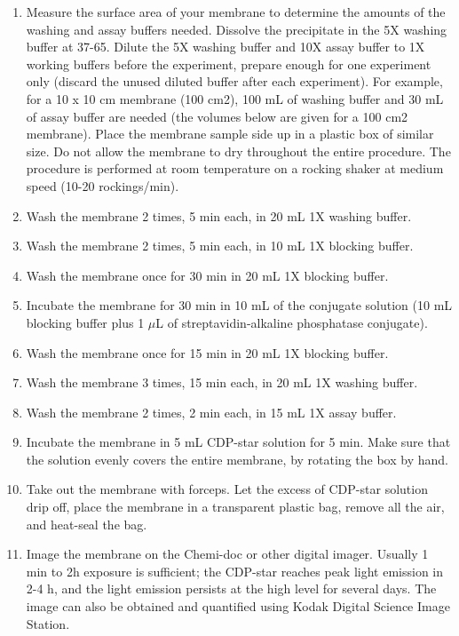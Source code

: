\documentclass{article}
\newcommand{\mul}{\ensuremath{\mu}L\xspace}
\newcommand{\degC}{\celsius\xspace}
\begin{document}
\begin{enumerate}[resume]
  \item Measure the surface area of your membrane to determine the amounts of the washing and assay buffers needed. Dissolve the precipitate in the 5X washing buffer at 37-65\degC. Dilute the 5X washing buffer and 10X assay buffer to 1X working buffers before the experiment, prepare enough for one experiment only (discard the unused diluted buffer after each experiment). For example, for a 10 x 10 cm membrane (100 cm2), 100 mL of washing buffer and 30 mL of assay buffer are needed (the volumes below are given for a 100 cm2 membrane). Place the membrane sample side up in a plastic box of similar size. Do not allow the membrane to dry throughout the entire procedure. The procedure is performed at room temperature on a rocking shaker at medium speed (10-20 rockings/min).
\item Wash the membrane 2 times, 5 min each, in 20 mL 1X washing buffer. 
\item Wash the membrane 2 times, 5 min each, in 10 mL 1X blocking buffer.
\item Wash the membrane once for 30 min in 20 mL 1X blocking buffer. 
\item Incubate the membrane for 30 min in 10 mL of the conjugate solution (10 mL
blocking buffer plus 1 \mul of streptavidin-alkaline phosphatase conjugate).   
\item Wash the membrane once for 15 min in 20 mL 1X blocking buffer. 
\item Wash the membrane 3 times, 15 min each, in 20 mL 1X washing buffer. 
\item Wash the membrane 2 times, 2 min each, in 15 mL 1X assay buffer. 
\item Incubate the membrane in 5 mL CDP-star solution for 5 min. Make sure that the solution evenly covers the entire membrane, by rotating the box by hand. 
\item Take out the membrane with forceps. Let the excess of CDP-star solution drip off, place the membrane in a transparent plastic bag, remove all the air, and heat-seal
the bag. 
\item Image the membrane on the Chemi-doc or other digital imager. Usually 1 min to 2h exposure is sufficient; the CDP-star reaches peak light emission in 2-4 h, and the light emission persists at the high level for several days. The image can also be obtained and quantified using Kodak Digital Science Image Station.
\end{enumerate}

\end{document}
